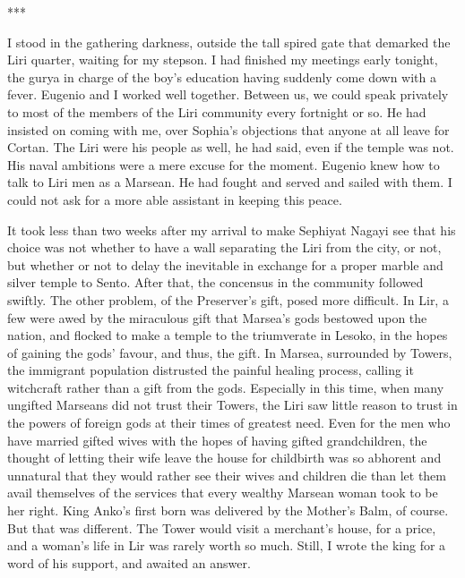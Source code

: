 \documentclass{article}
\begin{document}
\vspace{.5cm}

***

I stood in the gathering darkness, outside the tall spired gate that demarked the Liri quarter, waiting for my stepson. I had finished my meetings early tonight, the gurya in charge of the boy's education having suddenly come down with a fever. Eugenio and I worked well together. Between us, we could speak privately to most of the members of the Liri community every fortnight or so. He had insisted on coming with me, over Sophia's objections that anyone at all leave for Cortan. The Liri were his people as well, he had said, even if the temple was not. His naval ambitions were a mere excuse for the moment. Eugenio knew how to talk to Liri men as a Marsean. He had fought and served and sailed with them. I could not ask for a more able assistant in keeping this peace.

It took less than two weeks after my arrival to make Sephiyat Nagayi see that his choice was not whether to have a wall separating the Liri from the city, or not, but whether or not to delay the inevitable in exchange for a proper marble and silver temple to Sento. After that, the concensus in the community followed swiftly. The other problem, of the Preserver's gift, posed more difficult. In Lir, a few were awed by the miraculous gift that Marsea's gods bestowed upon the nation, and flocked to make a temple to the triumverate in Lesoko, in the hopes of gaining the gods' favour, and thus, the gift. In Marsea, surrounded by Towers, the immigrant population distrusted the painful healing process, calling it witchcraft rather than a gift from the gods. Especially in this time, when many ungifted Marseans did not trust their Towers, the Liri saw little reason to trust in the powers of foreign gods at their times of greatest need. Even for the men who have married gifted wives with the hopes of having gifted grandchildren, the thought of letting their wife leave the house for childbirth was so abhorent and unnatural that they would rather see their wives and children die than let them avail themselves of the services that every wealthy Marsean woman took to be her right. King Anko's first born was delivered by the Mother's Balm, of course. But that was different. The Tower would visit a merchant's house, for a price, and a woman's life in Lir was rarely worth so much. Still, I wrote the king for a word of his support, and awaited an answer. 
\end{document}

